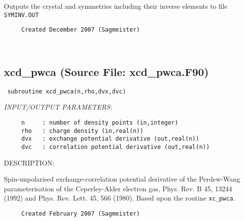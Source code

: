 \documentclass[11pt]{article}
\begin{document}
     Outputs the crystal and symmetries including their inverse
     elements to file {\tt SYMINV.OUT}
  
\begin{verbatim}     Created December 2007 (Sagmeister)\end{verbatim}








 
 
\mbox{}\hrulefill\ 
 
\subsection{xcd\_pwca (Source File: xcd\_pwca.F90)}


\begin{verbatim} subroutine xcd_pwca(n,rho,dvx,dvc)\end{verbatim}{\em INPUT/OUTPUT PARAMETERS:}
\begin{verbatim}     n     : number of density points (in,integer)
     rho   : charge density (in,real(n))
     dvx   : exchange potential derivative (out,real(n))
     dvc   : correlation potential derivative (out,real(n))\end{verbatim}
{\sf DESCRIPTION:\\ }


     Spin-unpolarised exchange-correlation potential derivative of the 
     Perdew-Wang
     parameterisation of the Ceperley-Alder electron gas,
     Phys. Rev. B 45, 13244
     (1992) and Phys. Rev. Lett. 45, 566 (1980).
     Based upon the routine {\tt xc\_pwca}.
  
\begin{verbatim}     Created February 2007 (Sagmeister)\end{verbatim}



\end{document}
